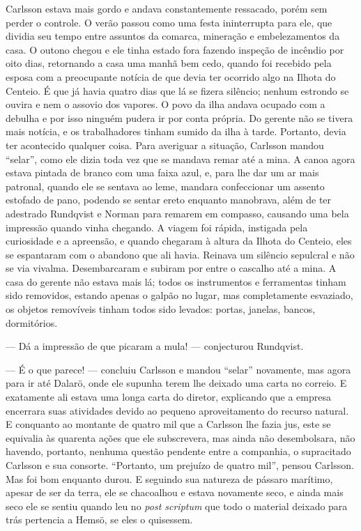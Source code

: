 Carlsson estava mais gordo e andava constantemente ressacado, porém sem perder o
controle. O verão passou como uma festa ininterrupta para ele, que dividia seu
tempo entre assuntos da comarca, mineração e embelezamentos da casa. O outono
chegou e ele tinha estado fora fazendo inspeção de incêndio por oito dias,
retornando a casa uma manhã bem cedo, quando foi recebido pela esposa com a
preocupante notícia de que devia ter ocorrido algo na Ilhota do Centeio. É que
já havia quatro dias que lá se fizera silêncio; nenhum estrondo se ouvira e nem o
assovio dos vapores. O povo da ilha andava ocupado com a debulha e por
isso ninguém pudera ir por conta própria. Do gerente não se tivera mais notícia,
e os trabalhadores tinham sumido da ilha à tarde. Portanto, devia ter acontecido
qualquer coisa. Para averiguar a situação, Carlsson mandou ``selar'', como ele
dizia toda vez que se mandava remar até a mina. A canoa agora estava pintada de
branco com uma faixa azul, e, para lhe dar um ar mais patronal, quando ele se
sentava ao leme, mandara confeccionar um assento estofado de pano, podendo se
sentar ereto enquanto manobrava, além de ter adestrado Rundqvist e Norman para
remarem em compasso, causando uma bela impressão quando vinha chegando. A viagem
foi rápida, instigada pela curiosidade e a apreensão, e quando chegaram à altura
da Ilhota do Centeio, eles se espantaram com o abandono que ali havia. Reinava
um silêncio sepulcral e não se via vivalma. Desembarcaram e
subiram por entre o cascalho até a mina. A casa do gerente não estava mais lá;
todos os instrumentos e ferramentas tinham sido removidos, estando apenas o galpão
no lugar, mas completamente esvaziado, os objetos removíveis tinham todos
sido levados: portas, janelas, bancos, dormitórios.

--- Dá a impressão de que picaram a mula! --- conjecturou Rundqvist. 

--- É o que parece! --- concluiu Carlsson e mandou ``selar'' novamente, mas agora para ir até Dalarö,
onde ele supunha terem lhe deixado uma carta no correio. E exatamente ali
estava uma longa carta do diretor, explicando que a empresa encerrara suas
atividades devido ao pequeno aproveitamento do recurso natural. E conquanto ao
montante de quatro mil que a Carlsson lhe fazia jus, este se equivalia às
quarenta ações que ele subscrevera, mas ainda não desembolsara, não havendo,
portanto, nenhuma questão pendente entre a companhia, o supracitado Carlsson e
sua consorte. ``Portanto, um prejuízo de quatro mil'', pensou Carlsson. Mas foi bom
enquanto durou. E seguindo sua natureza de pássaro marítimo, apesar de ser da
terra, ele se chacoalhou e estava novamente seco, e ainda mais seco ele se
sentiu quando leu no \textit{post scriptum} que todo o material deixado para
trás pertencia a Hemsö, se eles o quisessem.

